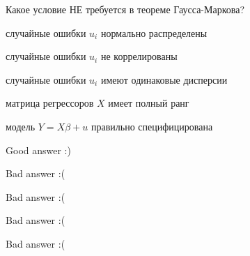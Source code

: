 
\begin{question}
Какое условие НЕ требуется в теореме Гаусса-Маркова?
\begin{answerlist}
  \item случайные ошибки \(u_i\) нормально распределены
  \item случайные ошибки \(u_i\) не коррелированы
  \item случайные ошибки \(u_i\) имеют одинаковые дисперсии
  \item матрица регрессоров \(X\) имеет полный ранг
  \item модель \(Y=X\beta + u\) правильно специфицирована
\end{answerlist}
\end{question}

\begin{solution}
\begin{answerlist}
  \item Good answer :)
  \item Bad answer :(
  \item Bad answer :(
  \item Bad answer :(
  \item Bad answer :(
\end{answerlist}
\end{solution}

